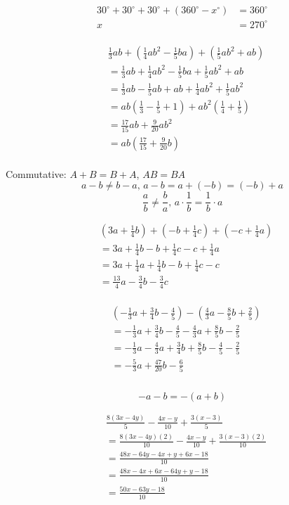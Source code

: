 \documentclass{article}
\begin{document}
\[\begin{aligned}
	30^\circ+30^\circ+30^\circ+(360^\circ-x^\circ)&=360^\circ\\
	x&=\boxed{270^\circ}
\end{aligned}\]
\\
\[\begin{aligned}
    &\frac13ab+\left(\frac14ab^2-\frac15ba\right)+\left(\frac15ab^2+ab\right)\\
    &=\frac13ab+\frac14ab^2-\frac15ba+\frac15ab^2+ab\\
    &=\frac13ab-\frac15ab+ab+\frac14ab^2+\frac15ab^2\\
    &=ab\left(\frac13-\frac15+1\right)+ab^2\left(\frac14+\frac15\right)\\
    &=\frac{17}{15}ab+\frac9{20}ab^2\\
    &=ab\left(\frac{17}{15}+\frac9{20}b\right)\\
\end{aligned}\]

Commutative: \(A+B=B+A\), \(AB=BA\)
\[a-b\ne b-a,\,a-b=a+(-b)=(-b)+a\]
\[\frac ab\ne \frac ba,\,a\cdot\frac1b=\frac1b\cdot a\]

\newpage

\[\begin{aligned}
    &\left(3a+\frac14b\right)+\left(-b+\frac14c\right)+\left(-c+\frac14a\right)\\
    &=3a+\frac14b-b+\frac14c-c+\frac14a\\
    &=3a+\frac14a+\frac14b-b+\frac14c-c\\
    &=\frac{13}4a-\frac34b-\frac34c
\end{aligned}\]
\\
\[\begin{aligned}
    &\left(-\frac13a+\frac34b-\frac45\right)-\left(\frac43a-\frac85b+\frac25\right)\\
    &=-\frac13a+\frac34b-\frac45-\frac43a+\frac85b-\frac25\\
    &=-\frac13a-\frac43a+\frac34b+\frac85b-\frac45-\frac25\\
    &=-\frac53a+\frac{47}{20}b-\frac65\\
\end{aligned}\]
\\
\[-a-b=-(a+b)\]

\[\begin{aligned}
    &\frac{8(3x-4y)}5-\frac{4x-y}{10}+\frac{3(x-3)}5\\
    &=\frac{8(3x-4y)(2)}{10}-\frac{4x-y}{10}+\frac{3(x-3)(2)}{10}\\
    &=\frac{48x-64y-4x+y+6x-18}{10}\\
    &=\frac{48x-4x+6x-64y+y-18}{10}\\
    &=\frac{50x-63y-18}{10}
\end{aligned}\]
\end{document}
